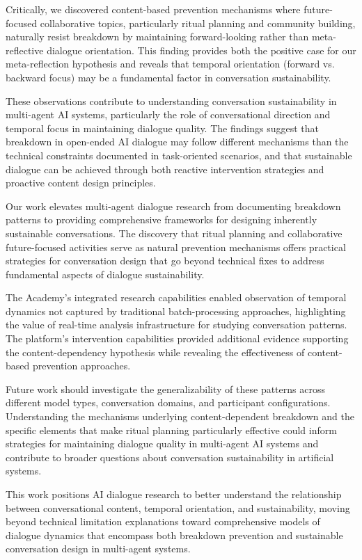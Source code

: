 \documentclass[11pt,letterpaper]{article}
\newcommand{\theacademy}{The Academy}
\begin{document}
Critically, we discovered content-based prevention mechanisms where future-focused collaborative topics, particularly ritual planning and community building, naturally resist breakdown by maintaining forward-looking rather than meta-reflective dialogue orientation. This finding provides both the positive case for our meta-reflection hypothesis and reveals that temporal orientation (forward vs. backward focus) may be a fundamental factor in conversation sustainability.

These observations contribute to understanding conversation sustainability in multi-agent AI systems, particularly the role of conversational direction and temporal focus in maintaining dialogue quality. The findings suggest that breakdown in open-ended AI dialogue may follow different mechanisms than the technical constraints documented in task-oriented scenarios, and that sustainable dialogue can be achieved through both reactive intervention strategies and proactive content design principles.

Our work elevates multi-agent dialogue research from documenting breakdown patterns to providing comprehensive frameworks for designing inherently sustainable conversations. The discovery that ritual planning and collaborative future-focused activities serve as natural prevention mechanisms offers practical strategies for conversation design that go beyond technical fixes to address fundamental aspects of dialogue sustainability.

\theacademy{}'s integrated research capabilities enabled observation of temporal dynamics not captured by traditional batch-processing approaches, highlighting the value of real-time analysis infrastructure for studying conversation patterns. The platform's intervention capabilities provided additional evidence supporting the content-dependency hypothesis while revealing the effectiveness of content-based prevention approaches.

Future work should investigate the generalizability of these patterns across different model types, conversation domains, and participant configurations. Understanding the mechanisms underlying content-dependent breakdown and the specific elements that make ritual planning particularly effective could inform strategies for maintaining dialogue quality in multi-agent AI systems and contribute to broader questions about conversation sustainability in artificial systems.

This work positions AI dialogue research to better understand the relationship between conversational content, temporal orientation, and sustainability, moving beyond technical limitation explanations toward comprehensive models of dialogue dynamics that encompass both breakdown prevention and sustainable conversation design in multi-agent systems.
\end{document}
